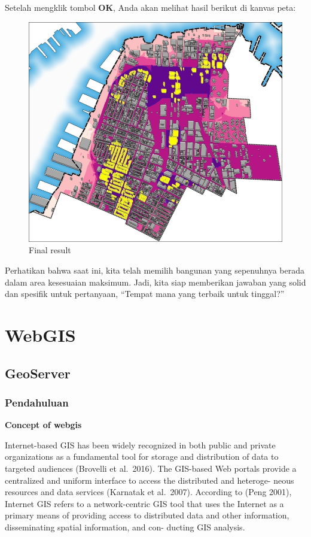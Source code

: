 \documentclass[]{book}
\begin{document}
Setelah mengklik tombol \textbf{OK}, Anda akan melihat hasil berikut di kanvas peta:

\begin{figure}

{\centering \includegraphics[width=0.7\linewidth]{images/04/fig49} 

}

\caption{Final result}\label{fig:fig1449}
\end{figure}

Perhatikan bahwa saat ini, kita telah memilih bangunan yang sepenuhnya berada dalam area kesesuaian maksimum. Jadi, kita siap memberikan jawaban yang solid dan spesifik untuk pertanyaan, ``Tempat mana yang terbaik untuk tinggal?''

\hypertarget{part-webgis}{%
\part{WebGIS}\label{part-webgis}}

\hypertarget{geoserver}{%
\chapter{GeoServer}\label{geoserver}}

\hypertarget{pendahuluan}{%
\section{Pendahuluan}\label{pendahuluan}}

\textbf{Concept of webgis}

Internet-based GIS has been widely recognized in both
public and private organizations as a fundamental tool for
storage and distribution of data to targeted audiences
(Brovelli et al.~2016).
The GIS-based Web portals provide a centralized and
uniform interface to access the distributed and heteroge-
neous resources and data services (Karnatak et al.~2007).
According to (Peng 2001), Internet GIS refers to a
network-centric GIS tool that uses the Internet as a primary
means of providing access to distributed data and other
information, disseminating spatial information, and con-
ducting GIS analysis.
\end{document}
